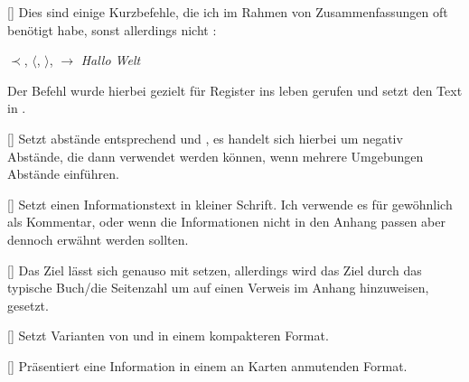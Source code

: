 [\cmdlist\anothercmd[1.0.2]{<}\cmdlist\anothercmd[1.0.2]{>}\cmdlist{}\cmdlist{}]
Dies sind einige Kurzbefehle, die ich im Rahmen von Zusammenfassungen oft benötigt habe, sonst allerdings nicht \Smiley:
{
    \def\imp{\ensuremath{\prec}}
    \def\<{\ensuremath{\langle}}
    \def\>{\ensuremath{\rangle}}
    \def\mto{\ensuremath{\to}}
    \def\reg#1{\T{#1}}
    \def\customex#1{\begingroup\scriptsize\textit{#1}\normalsize\endgroup}
    \begin{latex}[alsoletter={\\\#@_*<>}]
\imp, \<, \>, \mto %
\reg{Hallo Welt}   %
\customex{Hallo Welt}   %
    \end{latex}
}
Der Befehl  wurde hierbei gezielt für Register ins leben gerufen und setzt den Text in .

%
%
%

[\cmdlist{}\cmdlist{}]
Setzt abstände entsprechend  und , es handelt sich hierbei um negativ Abstände, die dann verwendet werden können, wenn mehrere Umgebungen Abstände einführen.

%
%
%

[]
Setzt einen Informationstext in kleiner Schrift. Ich verwende es für gewöhnlich als Kommentar, oder wenn die Informationen nicht in den Anhang passen aber dennoch erwähnt werden sollten.

%
%
%

[]
Das Ziel lässt sich genauso mit  setzen, allerdings wird das Ziel durch das typische Buch/die Seitenzahl um auf einen Verweis im Anhang hinzuweisen, gesetzt.

%
%
%

[\cmdlist{}]
Setzt Varianten von  und  in einem kompakteren Format.

%
%
%

[]
Präsentiert eine Information in einem an Karten anmutenden Format.

